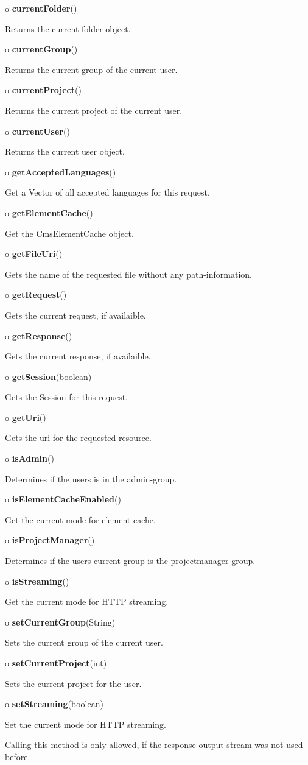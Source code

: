 \begin{description}
\item o {\bf currentFolder}()  

Returns the current folder object.  
\item o {\bf currentGroup}()  

Returns the current group of the current user.  
\item o {\bf currentProject}()  

Returns the current project of the current user.  
\item o {\bf currentUser}()  

Returns the current user object.  
\item o {\bf getAcceptedLanguages}()  

Get a Vector of all accepted languages for this request.  
\item o {\bf getElementCache}()  

Get the CmsElementCache object.  
\item o {\bf getFileUri}()  

Gets the name of the requested file without any path-information.  
\item o {\bf getRequest}()  

Gets the current request, if availaible.  
\item o {\bf getResponse}()  

Gets the current response, if availaible.  
\item o {\bf getSession}(boolean)  

Gets the Session for this request.  
\item o {\bf getUri}()  

Gets the uri for the requested resource.  
\item o {\bf isAdmin}()  

Determines if the users is in the admin-group.  
\item o {\bf isElementCacheEnabled}()  

Get the current mode for element cache.  
\item o {\bf isProjectManager}()  

Determines if the users current group is the projectmanager-group.  
\item o {\bf isStreaming}()  

Get the current mode for HTTP streaming.  
\item o {\bf setCurrentGroup}(String)  

Sets the current group of the current user.  
\item o {\bf setCurrentProject}(int)  

Sets the current project for the user.  
\item o {\bf setStreaming}(boolean)  

Set the current mode for HTTP streaming.

Calling this method is only allowed, if the response output stream was not
used before. 
\end{description}


